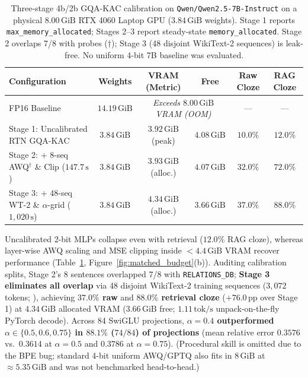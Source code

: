 \documentclass[10pt]{article} %
\newcommand{\gqakac}{\textsc{GQA-KAC}}
\begin{document}
\begin{table}[htbp]
\caption{Three-stage 4b/2b \gqakac{} calibration on \texttt{Qwen/Qwen2.5-7B-Instruct} on a physical $8.00\,\text{GiB}$ RTX 4060 Laptop GPU ($3.84\,\text{GiB}$ weights). Stage 1 reports \texttt{max\_memory\_allocated}; Stages 2--3 report steady-state \texttt{memory\_allocated}. Stage 2 overlaps 7/8 with probes ($\dagger$); Stage 3 (48 disjoint WikiText-2 sequences) is leak-free. No uniform 4-bit 7B baseline was evaluated.}
\label{tab:7b_challenge}
\begin{center}
\footnotesize\setlength{\tabcolsep}{4pt}
\begin{tabular}{l c c c c c}
\toprule
\textbf{Configuration} & \textbf{Weights} & \textbf{VRAM (Metric)} & \textbf{Free} & \textbf{Raw Cloze} & \textbf{RAG Cloze} \\
\midrule
FP16 Baseline & $14.19\,\text{GiB}$ & \multicolumn{2}{c}{\emph{Exceeds $8.00\,\text{GiB}$ VRAM (OOM)}} & --- & --- \\
Stage 1: Uncalibrated RTN \gqakac{} & $3.84\,\text{GiB}$ & $3.92\,\text{GiB}$ (peak) & $4.08\,\text{GiB}$ & $10.0\%$ & $12.0\%$ \\
Stage 2: + 8-seq AWQ$^\dagger$ \& Clip ($147.7\,\text{s}$) & $3.84\,\text{GiB}$ & $3.93\,\text{GiB}$ (alloc.) & $4.07\,\text{GiB}$ & $32.0\%$ & $72.0\%$ \\
Stage 3: + 48-seq WT-2 \& $\alpha$-grid ($1{,}020\,\text{s}$) & $3.84\,\text{GiB}$ & $4.34\,\text{GiB}$ (alloc.) & $3.66\,\text{GiB}$ & $\mathbf{37.0\%}$ & $\mathbf{88.0\%}$ \\
\bottomrule
\end{tabular}
\end{center}
\end{table}

Uncalibrated 2-bit MLPs collapse even with retrieval ($12.0\%$ RAG cloze), whereas layer-wise AWQ scaling and MSE clipping inside $<4.4\,\text{GiB}$ VRAM recover performance (Table~\ref{tab:7b_challenge}, Figure~\ref{fig:matched_budget}(b)). Auditing calibration splits, Stage 2's 8 sentences overlapped 7/8 with \texttt{RELATIONS\_DB}; \textbf{Stage 3 eliminates all overlap} via 48 disjoint WikiText-2 training sequences ($3{,}072$ tokens; \citealp{merity2017wikitext}), achieving \textbf{$37.0\%$ raw} and \textbf{$88.0\%$ retrieval cloze} ($+76.0\,\text{pp}$ over Stage 1) at $4.34\,\text{GiB}$ allocated VRAM ($3.66\,\text{GiB}$ free; $1.11\,\text{tok/s}$ unpack-on-the-fly PyTorch decode). Across 84 SwiGLU projections, \textbf{$\alpha = 0.4$ outperformed $\alpha \in \{0.5, 0.6, 0.75\}$ in $88.1\%$ ($74/84$) of projections} (mean relative error $0.3576$ vs.\ $0.3614$ at $\alpha=0.5$ and $0.3786$ at $\alpha=0.75$). (Procedural skill is omitted due to the BPE bug; standard 4-bit uniform AWQ/GPTQ also fits in $8\,\text{GiB}$ at $\approx 5.35\,\text{GiB}$ and was not benchmarked head-to-head.)
\end{document}
